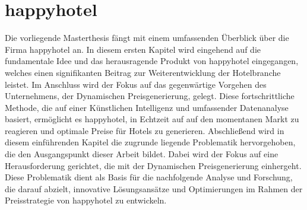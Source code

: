 \section{happyhotel}
\label{sec:happyhotel}
Die vorliegende Masterthesis fängt mit einem umfassenden Überblick über die Firma happyhotel an. In diesem ersten Kapitel wird eingehend auf die fundamentale Idee und das herausragende Produkt von happyhotel eingegangen, welches einen signifikanten Beitrag zur Weiterentwicklung der Hotelbranche leistet.
\newline
\newline
Im Anschluss wird der Fokus auf das gegenwärtige Vorgehen des Unternehmens, der Dynamischen Preisgenerierung, gelegt. Diese fortschrittliche Methode, die auf einer Künstlichen Intelligenz und umfassender Datenanalyse basiert, ermöglicht es happyhotel, in Echtzeit auf auf den momentanen Markt zu reagieren und optimale Preise für Hotels zu generieren.
\newline
\newline
Abschließend wird in diesem einführenden Kapitel die zugrunde liegende Problematik hervorgehoben, die den Ausgangspunkt dieser Arbeit bildet. Dabei wird der Fokus auf eine Herausforderung gerichtet, die mit der Dynamischen Preisgenerierung einhergeht. Diese Problematik dient als Basis für die nachfolgende Analyse und Forschung, die darauf abzielt, innovative Lösungsansätze und Optimierungen im Rahmen der Preisstrategie von happyhotel zu entwickeln.



